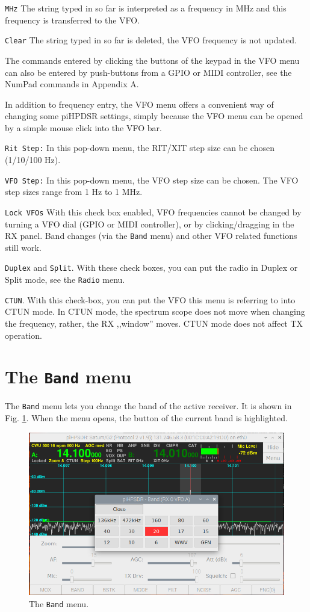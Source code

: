 \documentclass[12pt]{book}
\def\rett#1{\texttt{\color{red}#1}}
\def\bltt#1{\texttt{\color{blue}#1}}
\begin{document}
\rett{MHz} The string typed in so far is interpreted as a frequency in MHz
and this frequency is transferred to the VFO.

\rett{Clear} The string typed in so far is deleted, the VFO frequency is not
updated.

The commands entered by clicking the buttons of the keypad in the VFO menu
can also be entered by push-buttons from a GPIO or MIDI controller, see
the NumPad commands in Appendix A.

In addition to frequency entry, the VFO menu offers a convenient way of changing
some piHPDSR settings, simply because the VFO menu can be opened by a simple
mouse click into the VFO bar.

\rett{Rit Step:} In this pop-down menu, the RIT/XIT step size can be chosen
 (1/10/100 Hz).

\rett{VFO Step:} In this pop-down menu, the VFO step size can be chosen. The VFO step
sizes range from 1 Hz to 1 MHz.

\rett{Lock VFOs} With this check box enabled, VFO frequencies cannot be changed by
turning a VFO dial (GPIO or MIDI controller), or by clicking/dragging in the RX panel.
Band changes (via the \bltt{Band} menu) and other VFO related functions still work.

\rett{Duplex} and \rett{Split}. With these check boxes, you can put the radio
in Duplex or Split mode, see the \bltt{Radio} menu.

\rett{CTUN}. With this check-box, you can put the VFO this menu is referring to into
CTUN mode. In CTUN mode, the spectrum scope does not move when changing the frequency,
rather, the RX ,,window'' moves. CTUN mode does not affect TX operation.

\section{The \texttt{Band} menu}
\label{sec:bandmenu}
The \bltt{Band} menu lets you change the band of the active receiver. It is shown
in Fig. \ref{fig:BandMenu}. When the menu opens, the button of the current band
is highlighted.

\begin{figure}[ht]
\center
\includegraphics[width=12cm]{BandMenu.png}
\caption{The \bltt{Band} menu.}
\label{fig:BandMenu}
\end{figure}
\end{document}
